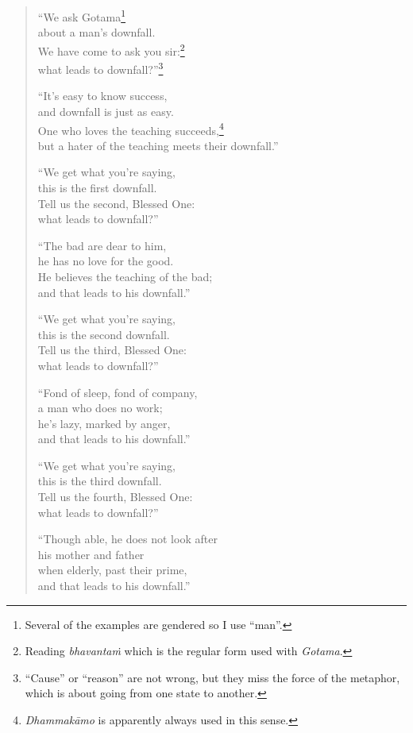 \documentclass[12pt,openany]{book}%
\begin{document}
\begin{verse}%
“We ask Gotama\footnote{Several of the examples are gendered so I use “man”. } \\
about a man’s downfall. \\
We have come to ask you sir:\footnote{Reading \textit{\textsanskrit{bhavantaṁ}} which is the regular form used with \textit{Gotama}. } \\
what leads to downfall?”\footnote{“Cause” or “reason” are not wrong, but they miss the force of the metaphor, which is about going from one state to another. } 

“It’s easy to know success, \\
and downfall is just as easy. \\
One who loves the teaching succeeds,\footnote{\textit{\textsanskrit{Dhammakāmo}} is apparently always used in this sense. } \\
but a hater of the teaching meets their downfall.” 

“We get what you’re saying, \\
this is the first downfall. \\
Tell us the second, Blessed One: \\
what leads to downfall?” 

“The bad are dear to him, \\
he has no love for the good. \\
He believes the teaching of the bad; \\
and that leads to his downfall.” 

“We get what you’re saying, \\
this is the second downfall. \\
Tell us the third, Blessed One: \\
what leads to downfall?” 

“Fond of sleep, fond of company, \\
a man who does no work; \\
he’s lazy, marked by anger, \\
and that leads to his downfall.” 

“We get what you’re saying, \\
this is the third downfall. \\
Tell us the fourth, Blessed One: \\
what leads to downfall?” 

“Though able, he does not look after \\
his mother and father \\
when elderly, past their prime, \\
and that leads to his downfall.” 


\end{verse}
\end{document}
